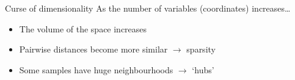 \begin{frame}{Curse of dimensionality}
    As the number of variables (coordinates) increases\ldots
    \begin{itemize}
        \item The volume of the space increases
        \item Pairwise distances become more similar $\rightarrow$ sparsity
        \item Some samples have huge neighbourhoods $\rightarrow$ `hubs'
    \end{itemize}
\end{frame}



